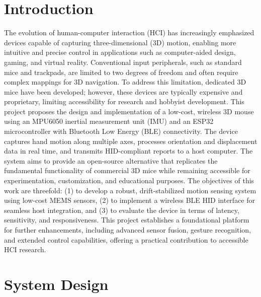 \documentclass[10pt]{article}
\begin{document}
\section*{Introduction} %
The evolution of human-computer interaction (HCI) has increasingly emphasized 
devices capable of capturing three-dimensional (3D) motion, enabling more 
intuitive and precise control in applications such as computer-aided design, 
gaming, and virtual reality. Conventional input peripherals, such as standard 
mice and trackpads, are limited to two degrees of freedom and often require 
complex mappings for 3D navigation. To address this limitation, dedicated 3D 
mice have been developed; however, these devices are typically expensive and 
proprietary, limiting accessibility for research and hobbyist development.
This project proposes the design and implementation of a low-cost, wireless 3D 
mouse using an MPU6050 inertial measurement unit (IMU) and an ESP32 
microcontroller with Bluetooth Low Energy (BLE) connectivity. The device captures 
hand motion along multiple axes, processes orientation and displacement data in 
real time, and transmits HID-compliant reports to a host computer. The system 
aims to provide an open-source alternative that replicates the fundamental 
functionality of commercial 3D mice while remaining accessible for 
experimentation, customization, and educational purposes. The objectives of this 
work are threefold: (1) to develop a robust, drift-stabilized motion sensing 
system using low-cost MEMS sensors, (2) to implement a wireless BLE HID interface 
for seamless host integration, and (3) to evaluate the device in terms of latency, sensitivity, and responsiveness. This project establishes a foundational platform for further enhancements, including advanced sensor fusion, gesture recognition, and extended control capabilities, offering a practical contribution to accessible HCI research.










\section*{System Design}
\end{document}
